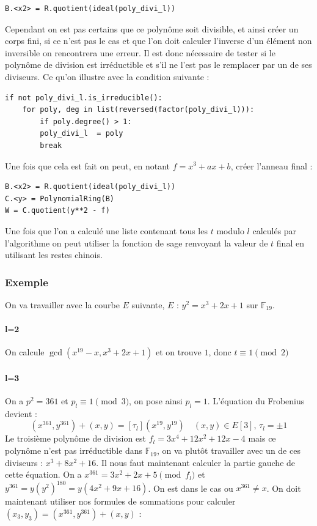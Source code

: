 \documentclass{article}
\begin{document}
\begin{lstlisting}
B.<x2> = R.quotient(ideal(poly_divi_l))
\end{lstlisting}
\bigskip
Cependant on est pas certains que ce polynôme soit divisible, et ainsi créer un corps fini, si ce n'est pas le cas et que l'on doit calculer l'inverse d'un élément non inversible on rencontrera une erreur. Il est donc nécessaire de tester si le polynôme de division est irréductible et s'il ne l'est pas le remplacer par un de ses diviseurs. Ce qu'on illustre avec la condition suivante :
\bigskip
\begin{lstlisting}
if not poly_divi_l.is_irreducible():      
	for poly, deg in list(reversed(factor(poly_divi_l))):
		if poly.degree() > 1:
		poly_divi_l  = poly
		break
\end{lstlisting}
\bigskip
Une fois que cela est fait on peut, en notant $f=x^3 +ax+b$, créer l'anneau final :
\bigskip
\begin{lstlisting}
B.<x2> = R.quotient(ideal(poly_divi_l))
C.<y> = PolynomialRing(B)
W = C.quotient(y**2 - f)
\end{lstlisting}
\bigskip
Une fois que l'on a calculé une liste  contenant tous les $t$ modulo $l$ calculés par l'algorithme on peut utiliser la fonction de sage  renvoyant la valeur de $t$ final en utilisant les restes chinois.
\subsubsection{Exemple}
On va travailler avec la courbe $E$ suivante, $E$ : $y^2 =x^3 +2x+1$ sur $\mathbb{F}_{19}$.

\paragraph{$\textbf{l=2}$}
On calcule $\gcd(x^{19} -x, x^3 + 2x+1)$ et on trouve $1$, donc $t \equiv 1 \pmod 2$

\paragraph{$\textbf{l=3}$}
On a $p^2 = 361$ et $p_l \equiv 1 \pmod 3$, on pose ainsi $p_l = 1$. L'équation du Frobenius devient : 
\begin{equation}
(x^{361}, y^{361}) + (x,y) = [\tau_l](x^{19}, y^{19})  \quad (x,y) \in E[3], \, \tau_l = \pm 1
\end{equation}
Le troisième polynôme de division est $f_l = 3x^4 + 12x^2 +12x - 4$ mais ce polynôme n'est pas irréductible dans $\mathbb{F}_{19}$, on va plutôt travailler avec un de ces diviseurs : $x^3 + 8x^2+16$.
\newline 
Il nous faut maintenant calculer la partie gauche de cette équation.
On a $x^{361} = 3x^2 +2x +5 \pmod f_{l}$ et $y^{361} = y(y^2)^{180} = y(4x^2+9x+16)$. On est dans le cas ou $x^{361} \ne x$. On doit maintenant utiliser nos formules de sommations pour calculer $(x_3, y_3) =(x^{361}, y^{361}) + (x,y)$ : 
\end{document}
